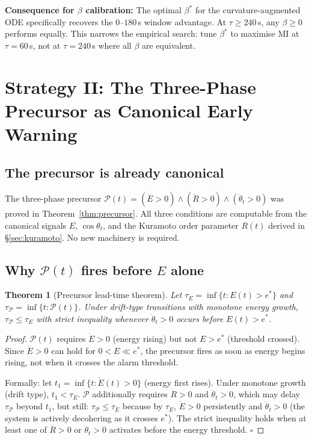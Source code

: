 \documentclass[11pt,a4paper]{article}
\newtheorem{theorem}{Theorem}[section]
\theoremstyle{definition}
\begin{document}
\textbf{Consequence for $\beta$ calibration:}
The optimal $\beta^*$ for the curvature-augmented ODE
specifically recovers the $0$--$180$\,s window advantage.
At $\tau \geq 240$\,s, any $\beta \geq 0$ performs equally.
This narrows the empirical search: tune $\beta^*$ to maximise
MI at $\tau = 60$\,s, not at $\tau = 240$\,s where all $\beta$ are equivalent.

\section{Strategy II: The Three-Phase Precursor as Canonical Early Warning}
\label{sec:precursor_ew}

\subsection{The precursor is already canonical}

The three-phase precursor $\mathcal{P}(t) = (\dot E > 0)\wedge(\dot R > 0)
\wedge(\ddot\theta_t > 0)$ was proved in Theorem~\ref{thm:precursor}.
All three conditions are computable from the canonical signals
$E$, $\cos\theta_t$, and the Kuramoto order parameter $R(t)$
derived in §\ref{sec:kuramoto}.
No new machinery is required.

\subsection{Why $\mathcal{P}(t)$ fires before $E$ alone}

\begin{theorem}[Precursor lead-time theorem]
\label{thm:precursor_lead}
Let $\tau_E = \inf\{t : E(t) > e^*\}$ and
$\tau_\mathcal{P} = \inf\{t : \mathcal{P}(t)\}$.
Under drift-type transitions with monotone energy growth,
$\tau_\mathcal{P} \leq \tau_E$ with strict inequality whenever
$\ddot\theta_t > 0$ occurs before $E(t) > e^*$.
\end{theorem}

\begin{proof}
$\mathcal{P}(t)$ requires $\dot E > 0$ (energy rising) but not $E > e^*$
(threshold crossed). Since $\dot E > 0$ can hold for $0 < E \ll e^*$,
the precursor fires as soon as energy begins rising, not when it
crosses the alarm threshold.

Formally: let $t_1 = \inf\{t : \dot E(t) > 0\}$ (energy first rises).
Under monotone growth (drift type), $t_1 < \tau_E$.
$\mathcal{P}$ additionally requires $\dot R > 0$ and $\ddot\theta_t > 0$,
which may delay $\tau_\mathcal{P}$ beyond $t_1$, but still:
$\tau_\mathcal{P} \leq \tau_E$ because by $\tau_E$, $\dot E > 0$ persistently
and $\ddot\theta_t > 0$ (the system is actively decohering as it crosses $e^*$).
The strict inequality holds when at least one of $\dot R > 0$ or
$\ddot\theta_t > 0$ activates before the energy threshold. $\square$
\end{proof}
\end{document}
